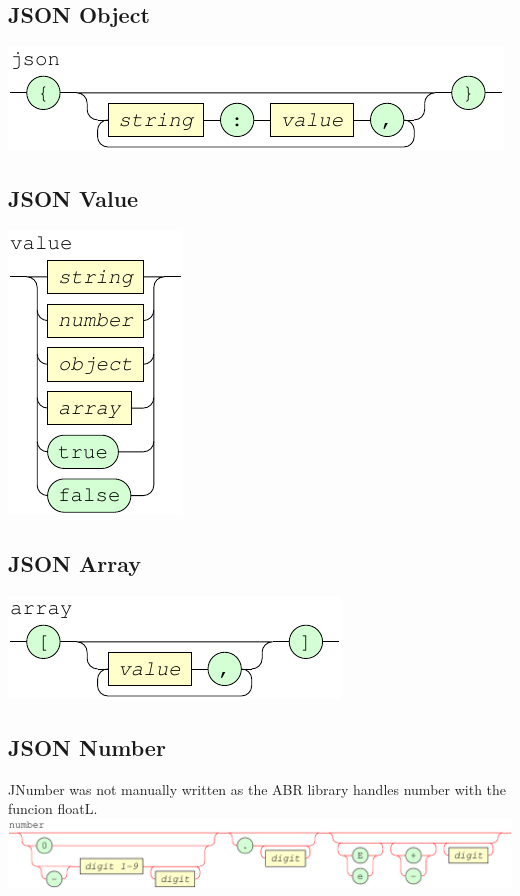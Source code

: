 \documentclass[a4paper]{article}
\begin{document}
\subsection{JSON Object}
{\centering
   \includegraphics[scale=0.9]{syntax/json}
}

\subsection{JSON Value}
{\centering
   \includegraphics[scale=0.9]{syntax/value}
}

\subsection{JSON Array}
{\centering
   \includegraphics[scale=0.9]{syntax/array}
}

\subsection{JSON Number}
JNumber was not manually written as the ABR library handles number with the funcion floatL.
{\centering
   \includegraphics[scale=0.9]{syntax/number}
}
\end{document}
